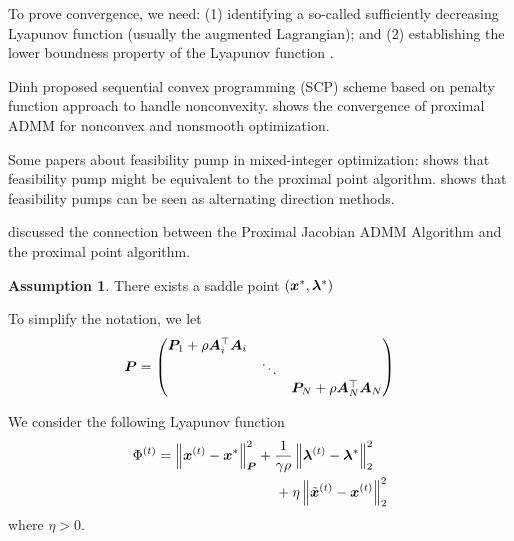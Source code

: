 \documentclass[twocolumn,amsthm]{autart}%
\theoremstyle{definition}
\newtheorem{assumption}{Assumption}
\theoremstyle{plain}
\begin{document}
To prove convergence, we need: (1) identifying a so-called sufficiently decreasing Lyapunov function (usually the augmented Lagrangian); and
(2) establishing the lower boundness property of the Lyapunov
function \cite{yang2022proximal}.

Dinh \etal \cite{dinh2013dual} proposed sequential convex programming (SCP) scheme based on penalty function approach to handle nonconvexity.
\cite{yang2022proximal} shows the convergence of proximal ADMM for nonconvex and nonsmooth optimization.

Some papers about feasibility pump in mixed-integer optimization: \cite{boland2012new} shows that feasibility pump might be equivalent to the proximal point algorithm.
\cite{geissler2017penalty} shows that feasibility pumps can be seen as alternating direction methods.

\cite[Section V]{deng2017parallel} discussed the connection between the Proximal Jacobian ADMM Algorithm and the proximal point algorithm.


\begin{assumption}
There exists a saddle point $(\boldsymbol{x}^{*}, \boldsymbol{\lambda}^{*})$
\end{assumption}

To simplify the notation, we let
\begin{equation}
\boldsymbol{P} = 
\begin{pmatrix}
\boldsymbol{P}_{1} + \rho \boldsymbol{A}_i^\top \boldsymbol{A}_i \\
& \ddots \\
& & \boldsymbol{P}_N + \rho \boldsymbol{A}_N^\top \boldsymbol{A}_N
\end{pmatrix}
\end{equation}

We consider the following Lyapunov function
\begin{equation}
\begin{multlined}
\Phi^{(t)} = \norm{\bbsym{x}^{(t)}-\bbsym{x}^{*}}^2_{\bbsym{P}}
+ \frac{1}{\gamma \rho} \norm{\bbsym{\lambda}^{(t)}-\bbsym{\lambda}^{*}}_2^2 \\
+ \eta \norm{\xtil^{(t)} - \bbsym{x}^{(t)}}_2^2
\end{multlined}
\end{equation}
where $\eta > 0$.
\end{document}
